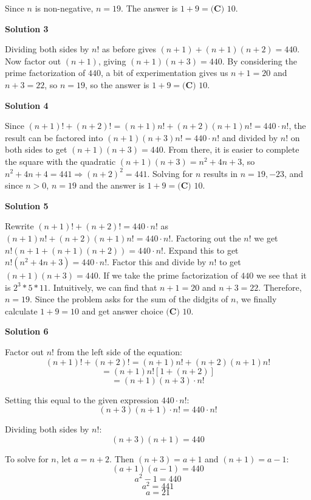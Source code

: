 \begin{enumerate}
 Since $n$ is non-negative, $n=19$. The answer is $1 + 9 = \boxed{\textbf{(C) }10}$.

 



\textbf{Solution 3}

Dividing both sides by $n!$ as before gives $(n+1)+(n+1)(n+2)=440$. Now factor out $(n+1)$, giving $(n+1)(n+3)=440$. By considering the prime factorization of $440$, a bit of experimentation gives us $n+1=20$ and $n+3=22$, so $n=19$, so the answer is $1 + 9 = \boxed{\textbf{(C) }10}$.

 



\textbf{Solution 4}

Since $(n+1)! + (n+2)! = (n+1)n! + (n+2)(n+1)n! = 440 \cdot n!$, the result can be factored into $(n+1)(n+3)n!=440 \cdot n!$ and divided by $n!$ on both sides to get $(n+1)(n+3)=440$. From there, it is easier to complete the square with the quadratic $(n+1)(n+3) = n^2 + 4n + 3$, so $n^2+4n+4=441 \Rightarrow (n+2)^2=441$. Solving for $n$ results in $n=19,-23$, and since $n>0$, $n=19$ and the answer is $1 + 9 = \boxed{\textbf{(C) }10}$.

 



\textbf{Solution 5}

Rewrite $(n+1)! + (n+2)! = 440 \cdot n!$ as $(n+1)n! + (n+2)(n+1)n! = 440 \cdot n!.$ Factoring out the $n!$ we get $n!(n + 1 + (n+1)(n+2)) = 440 \cdot n!.$ Expand this to get $n!(n^2 + 4n + 3) = 440 \cdot n!.$ Factor this and divide by $n!$ to get $(n + 1)(n + 3) = 440.$ If we take the prime factorization of $440$ we see that it is $2^3 * 5 * 11.$ Intuitively, we can find that $n + 1 = 20$ and $n + 3 = 22.$ Therefore, $n = 19.$ Since the problem asks for the sum of the didgits of $n$, we finally calculate $1 + 9 = 10$ and get answer choice $\boxed{\textbf{(C) }10}$.

 



\textbf{Solution 6}

Factor out $n!$ from the left side of the equation:
 \[(n+1)! + (n+2)! = (n+1)n! + (n+2)(n+1)n!\]
 \[= (n+1)n! \left[ 1 + (n+2) \right]\]
 \[= (n+1)(n+3) \cdot n!\]

 Setting this equal to the given expression $440 \cdot n!$:
 \[(n+3)(n+1) \cdot n! = 440 \cdot n!\]

 Dividing both sides by $n!$:
 \[(n+3)(n+1) = 440\]

 To solve for $n$, let $a = n+2$. Then $(n+3) = a+1$ and $(n+1) = a-1$:
 \[(a+1)(a-1) = 440\]
 \[a^2 - 1 = 440\]
 \[a^2 = 441\]
 \[a = 21\]


\end{enumerate}
